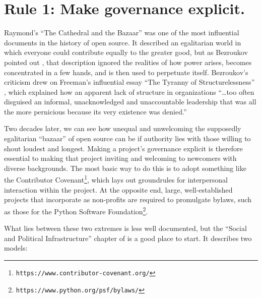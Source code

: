 \documentclass[10pt,letterpaper]{article}
\newcommand{\rulemajor}[1]{\section{#1}}
\newcommand{\withurl}[2]{{#1}\footnote{{\texttt{#2}}}}
\begin{document}
\rulemajor{Rule 1: Make governance explicit.}

Raymond's ``The Cathedral and the Bazaar'' \cite{raymond2001}
was one of the most influential documents in the history of open source.
It described an egalitarian world in which everyone could contribute equally to the greater good,
but as Bezroukov pointed out \cite{bezroukov1999},
that description ignored the realities of how power arises,
becomes concentrated in a few hands,
and is then used to perpetuate itself.
Bezroukov's criticism drew on Freeman's influential essay ``The Tyranny of Structurelessness'' \cite{freeman1972},
which explained how an apparent lack of structure in organizations ``{\ldots}too often disguised an informal,
unacknowledged and unaccountable leadership that was all the more pernicious because its very existence was denied.''

Two decades later,
we can see how unequal and unwelcoming the supposedly egalitarian ``bazaar'' of open source can be
if authority lies with those willing to shout loudest and longest.
Making a project's governance explicit is therefore essential to making that project inviting and welcoming to newcomers with diverse backgrounds.
The most basic way to do this is to adopt something like the \withurl{Contributor Covenant}{https://www.contributor-covenant.org/},
which lays out groundrules for interpersonal interaction within the project.
At the opposite end,
large, well-established projects that incorporate as non-profits are required to promulgate bylaws,
such as those for the \withurl{Python Software Foundation}{https://www.python.org/psf/bylaws/}.

What lies between these two extremes is less well documented,
but the ``Social and Political Infrastructure'' chapter of \cite{fogel2005} is a good place to start.
It describes two models:
\end{document}

